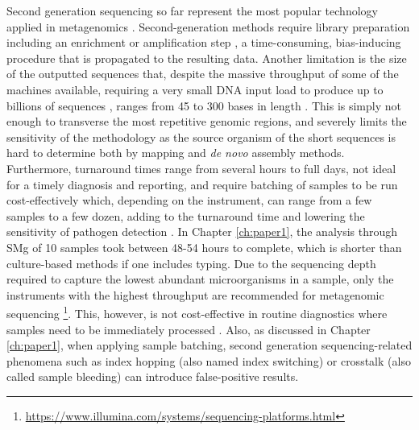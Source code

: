 Second generation sequencing so far represent the most popular technology applied in metagenomics \citep{rossen_practical_2018, loman_twenty_2015, loman_high-throughput_2012, schuele_future_2021}. Second-generation methods require library preparation including an enrichment or amplification step \citep{hagemann_overview_2015}, a time-consuming, bias-inducing procedure that is propagated to the resulting data. Another limitation is the size of the outputted sequences that, despite the massive throughput of some of the machines available, requiring a very small \ac{DNA} input load to produce up to billions of sequences \citep{loman_twenty_2015}, ranges from 45 to 300 bases in length \citep{loman_performance_2012, ari_next-generation_2016}. This is simply not enough to transverse the most repetitive genomic regions, and severely limits the sensitivity of the methodology as the source organism of the short sequences is hard to determine both by mapping and \textit{de novo} assembly methods. Furthermore, turnaround times range from several hours to full days, not ideal for a timely diagnosis and reporting, and require batching of samples to be run cost-effectively which, depending on the instrument, can range from a few samples to a few dozen, adding to the turnaround time and lowering the sensitivity of pathogen detection \citep{greninger_challenge_2018, schuele_future_2021}. In Chapter \ref{ch:paper1}, the analysis through \ac{SMg} of 10 samples took between 48-54 hours to complete, which is shorter than culture-based methods if one includes typing. Due to the sequencing depth required to capture the lowest abundant microorganisms in a sample, only the instruments with the highest throughput are recommended for metagenomic sequencing \footnote{ \url{https://www.illumina.com/systems/sequencing-platforms.html}}. This, however, is not cost-effective in routine diagnostics where samples need to be immediately processed \citep{rossen__2018}. Also, as discussed in Chapter \ref{ch:paper1}, when applying sample batching, second generation sequencing-related phenomena such as index hopping (also named index switching) or crosstalk (also called sample bleeding) can introduce false-positive results.

